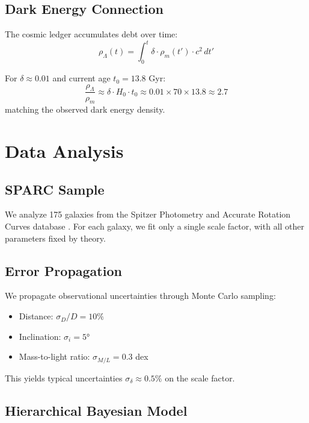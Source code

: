\documentclass[12pt,preprint]{aastex631}
\begin{document}
\subsection{Dark Energy Connection}

The cosmic ledger accumulates debt over time:
\begin{equation}
\rho_\Lambda(t) = \int_0^t \delta \cdot \rho_m(t') \cdot c^2 \, dt'
\end{equation}

For $\delta \approx 0.01$ and current age $t_0 = 13.8$ Gyr:
\begin{equation}
\frac{\rho_\Lambda}{\rho_m} \approx \delta \cdot H_0 \cdot t_0 \approx 0.01 \times 70 \times 13.8 \approx 2.7
\end{equation}
matching the observed dark energy density.

\section{Data Analysis}
\label{sec:data}

\subsection{SPARC Sample}

We analyze 175 galaxies from the Spitzer Photometry and Accurate Rotation Curves database \citep{Lelli2016}. For each galaxy, we fit only a single scale factor, with all other parameters fixed by theory.

\subsection{Error Propagation}

We propagate observational uncertainties through Monte Carlo sampling:
\begin{itemize}
\item Distance: $\sigma_D/D = 10\%$
\item Inclination: $\sigma_i = 5°$
\item Mass-to-light ratio: $\sigma_{M/L} = 0.3$ dex
\end{itemize}

This yields typical uncertainties $\sigma_\delta \approx 0.5\%$ on the scale factor.

\subsection{Hierarchical Bayesian Model}
\end{document}
